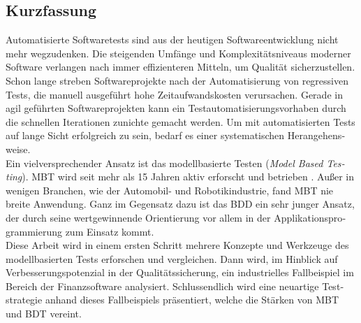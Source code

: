 
\cleardoublepage
{}


%

\begin{otherlanguage}{ngerman}

\chapter*{Kurzfassung}

Automatisierte Softwaretests sind aus der heutigen Softwareentwicklung nicht mehr wegzudenken. Die steigenden Umfänge und Komplexitätsniveaus moderner Software verlangen nach immer effizienteren Mitteln, um Qualität sicherzustellen. Schon lange streben Softwareprojekte nach der Automatisierung von regressiven Tests, die manuell ausgeführt hohe Zeitaufwandskosten verursachen. Gerade in agil geführten Softwareprojekten kann ein Testautomatisierungsvorhaben durch die schnellen Iterationen zunichte gemacht werden. Um mit automatisierten Tests auf lange Sicht erfolgreich zu sein, bedarf es einer systematischen Herangehensweise.\\

Ein vielversprechender Ansatz ist das modellbasierte Testen (\textit{Model Based Testing}). \Gls{MBT} wird seit mehr als 15 Jahren aktiv erforscht und betrieben \cite{utting_practical_2007}. Außer in wenigen Branchen, wie der Automobil- und Robotikindustrie, fand \Gls{MBT} nie breite Anwendung. Ganz im Gegensatz dazu ist das \Gls{BDD} ein sehr junger Ansatz, der durch seine wertgewinnende Orientierung vor allem in der Applikationsprogrammierung zum Einsatz kommt.\\

Diese Arbeit wird in einem ersten Schritt mehrere Konzepte und Werkzeuge des modellbasierten Tests erforschen und vergleichen. Dann wird, im Hinblick auf Verbesserungspotenzial in der Qualitätssicherung, ein industrielles Fallbeispiel im Bereich der Finanzsoftware analysiert. Schlussendlich wird eine neuartige Teststrategie anhand dieses Fallbeispiels präsentiert, welche die Stärken von \Gls{MBT} und \Gls{BDT} vereint. \\


\end{otherlanguage}
